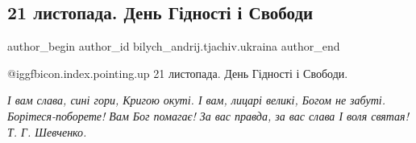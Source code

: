  
 
 
 
 
 
\subsection{21 листопада. День Гідності і Свободи}
\label{sec:21_11_2021.fb.bilych_andrij.tjachiv.ukraina.1.den_gidnosti_i_svobody}
 
\ifcmt
 author_begin
   author_id bilych_andrij.tjachiv.ukraina
 author_end
\fi

@igg{fbicon.index.pointing.up} 21 листопада. День Гідності і Свободи. 

\begin{center}
\obeycr
\Large\color{blue}\em
І вам слава, сині гори,
Кригою окуті.
І вам, лицарі великі,
Богом не забуті.
Борітеся-поборете!
Вам Бог помагає!
За вас правда, за вас слава
І воля святая!
\smallskip
Т. Г. Шевченко.
\restorecr
\end{center}

\begin{multicols}{2}
\end{multicols}
